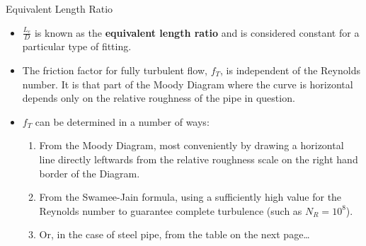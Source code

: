 \documentclass[9pt,xcolor={svgnames, x11names},professionalfonts, mathserif]{beamer}
\begin{document}
\begin{frame}{Equivalent Length Ratio}

 \begin{itemize}

  \item $\frac{L_e}{D}$ is known as the \textbf{equivalent length ratio} and is considered constant for a particular
        type of fitting.\parb
  \item The friction factor for fully turbulent flow, $f_T$, is independent of the Reynolds number. It is that part of
        the Moody Diagram where the curve is horizontal depends only on the relative roughness of the pipe in question.\parb
  \item $f_T$ can be determined in a number of ways:\pars
        \begin{enumerate}
         \item   From the Moody Diagram, most conveniently by drawing a horizontal line directly leftwards from the relative
               roughness scale on the right hand border of the Diagram.\parm
         \item From the Swamee-Jain formula, using a sufficiently high value for the Reynolds number to guarantee complete
               turbulence (such as $N_R=10^8$).\parm
         \item Or, in the case of steel pipe, from the table on the next page\ldots
        \end{enumerate}




 \end{itemize}
\end{frame}


\end{document}
